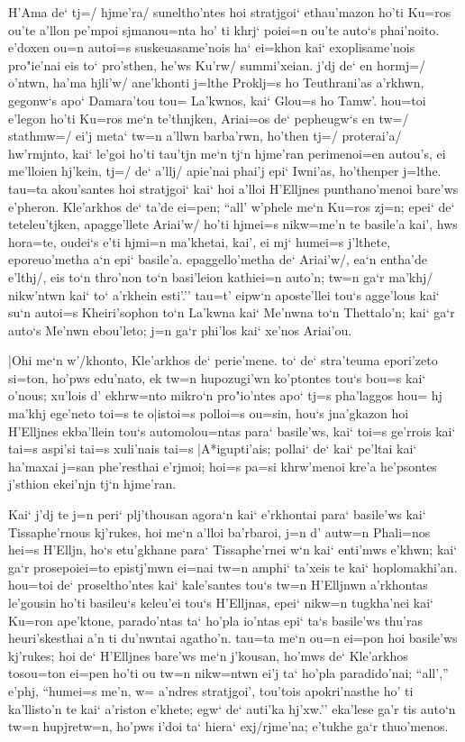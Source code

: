 H'Ama de` tj=/ hjme'ra/ suneltho'ntes hoi stratjgoi` ethau'mazon ho'ti 
Ku=ros ou'te a'llon pe'mpoi sjmanou=nta ho' ti khrj` poiei=n ou'te 
auto`s phai'noito. e'doxen ou=n autoi=s suskeuasame'nois ha` ei=khon 
kai` exoplisame'nois pro"ie'nai eis to` pro'sthen, he'ws Ku'rw/ 
summi'xeian. j'dj de` en hormj=/ o'ntwn, ha'ma hjli'w/ ane'khonti 
j=lthe Proklj=s ho Teuthrani'as a'rkhwn, gegonw`s apo` Damara'tou tou= 
La'kwnos, kai` Glou=s ho Tamw'. hou=toi e'legon ho'ti Ku=ros me`n 
te'thnjken, Ariai=os de` pepheugw`s en tw=/ stathmw=/ ei'j meta` tw=n 
a'llwn barba'rwn, ho'then tj=/ proterai'a/ hw'rmjnto, kai` le'goi 
ho'ti tau'tjn me`n tj`n hjme'ran perimenoi=en autou's, ei me'lloien 
hj'kein, tj=/ de` a'llj/ apie'nai phai'j epi` Iwni'as, ho'thenper 
j=lthe. tau=ta akou'santes hoi stratjgoi` kai` hoi a'lloi H'Elljnes 
punthano'menoi bare'ws e'pheron. Kle'arkhos de` ta'de ei=pen; ``all' 
w'phele me`n Ku=ros zj=n; epei` de` teteleu'tjken, apagge'llete 
Ariai'w/ ho'ti hjmei=s nikw=me'n te basile'a kai', hws hora=te, 
oudei`s e'ti hjmi=n ma'khetai, kai', ei mj` humei=s j'lthete, 
eporeuo'metha a`n epi` basile'a. epaggello'metha de` Ariai'w/, ea`n 
entha'de e'lthj/, eis to`n thro'non to`n basi'leion kathiei=n auto'n; 
tw=n ga`r ma'khj/ nikw'ntwn kai` to` a'rkhein esti'.'' tau=t' eipw`n 
aposte'llei tou`s agge'lous kai` su`n autoi=s Kheiri'sophon to`n 
La'kwna kai` Me'nwna to`n Thettalo'n; kai` ga`r auto`s Me'nwn 
ebou'leto; j=n ga`r phi'los kai` xe'nos Ariai'ou.

|Ohi me`n w'/khonto, Kle'arkhos de` perie'mene. to` de` stra'teuma 
epori'zeto si=ton, ho'pws edu'nato, ek tw=n hupozugi'wn ko'ptontes 
tou`s bou=s kai` o'nous; xu'lois d' ekhrw=nto mikro`n pro"io'ntes apo` 
tj=s pha'laggos hou= hj ma'khj ege'neto toi=s te o|istoi=s polloi=s 
ou=sin, hou`s jna'gkazon hoi H'Elljnes ekba'llein tou`s 
automolou=ntas para` basile'ws, kai` toi=s ge'rrois kai` tai=s aspi'si 
tai=s xuli'nais tai=s |A*igupti'ais; pollai` de` kai` pe'ltai kai` 
ha'maxai j=san phe'resthai e'rjmoi; hoi=s pa=si khrw'menoi kre'a 
he'psontes j'sthion ekei'njn tj`n hjme'ran.

Kai` j'dj te j=n peri` plj'thousan agora`n kai` e'rkhontai para` 
basile'ws kai` Tissaphe'rnous kj'rukes, hoi me`n a'lloi ba'rbaroi, j=n 
d' autw=n Phali=nos hei=s H'Elljn, ho`s etu'gkhane para` Tissaphe'rnei 
w`n kai` enti'mws e'khwn; kai` ga`r prosepoiei=to epistj'mwn ei=nai 
tw=n amphi` ta'xeis te kai` hoplomakhi'an. hou=toi de` proseltho'ntes 
kai` kale'santes tou`s tw=n H'Elljnwn a'rkhontas le'gousin ho'ti 
basileu`s keleu'ei tou`s H'Elljnas, epei` nikw=n tugkha'nei kai` 
Ku=ron ape'ktone, parado'ntas ta` ho'pla io'ntas epi` ta`s basile'ws 
thu'ras heuri'skesthai a'n ti du'nwntai agatho'n. tau=ta me`n ou=n 
ei=pon hoi basile'ws kj'rukes; hoi de` H'Elljnes bare'ws me`n 
j'kousan, ho'mws de` Kle'arkhos tosou=ton ei=pen ho'ti ou tw=n 
nikw=ntwn ei'j ta` ho'pla paradido'nai; ``all','' e'phj, ``humei=s 
me'n, w= a'ndres stratjgoi', tou'tois apokri'nasthe ho' ti 
ka'llisto'n te kai` a'riston e'khete; egw` de` auti'ka hj'xw.'' 
eka'lese ga'r tis auto`n tw=n hupjretw=n, ho'pws i'doi ta` hiera` 
exj/rjme'na; e'tukhe ga`r thuo'menos.

\bye
